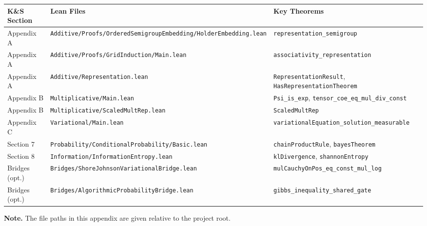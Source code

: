 \documentclass[11pt]{article}
\begin{document}
\footnotesize
\begin{longtable}{p{2.2cm}p{8.0cm}p{4.3cm}}
\toprule
\textbf{K\&S Section} & \textbf{Lean Files} & \textbf{Key Theorems} \\
\midrule
\endhead
Appendix A & \nolinkurl{Additive/Proofs/OrderedSemigroupEmbedding/HolderEmbedding.lean} & \nolinkurl{representation_semigroup} \\
Appendix A & \nolinkurl{Additive/Proofs/GridInduction/Main.lean} & \nolinkurl{associativity_representation} \\
Appendix A & \nolinkurl{Additive/Representation.lean} & \nolinkurl{RepresentationResult}, \nolinkurl{HasRepresentationTheorem} \\
Appendix B & \nolinkurl{Multiplicative/Main.lean} & \nolinkurl{Psi_is_exp}, \nolinkurl{tensor_coe_eq_mul_div_const} \\
Appendix B & \nolinkurl{Multiplicative/ScaledMultRep.lean} & \nolinkurl{ScaledMultRep} \\
Appendix C & \nolinkurl{Variational/Main.lean} & \nolinkurl{variationalEquation_solution_measurable} \\
Section 7 & \nolinkurl{Probability/ConditionalProbability/Basic.lean} & \nolinkurl{chainProductRule}, \nolinkurl{bayesTheorem} \\
Section 8 & \nolinkurl{Information/InformationEntropy.lean} & \nolinkurl{klDivergence}, \nolinkurl{shannonEntropy} \\
Bridges (opt.) & \nolinkurl{Bridges/ShoreJohnsonVariationalBridge.lean} & \nolinkurl{mulCauchyOnPos_eq_const_mul_log} \\
Bridges (opt.) & \nolinkurl{Bridges/AlgorithmicProbabilityBridge.lean} & \nolinkurl{gibbs_inequality_shared_gate} \\
\bottomrule
\end{longtable}

\noindent\textbf{Note.} The file paths in this appendix are given relative to the project root.
\end{document}
